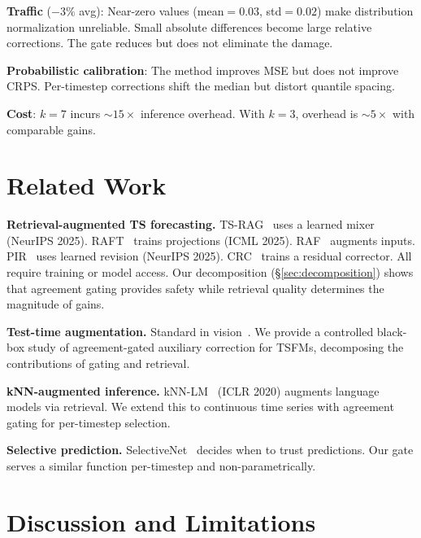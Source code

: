 \documentclass{article}
\begin{document}
\textbf{Traffic} ($-3\%$ avg): Near-zero values (mean${=}0.03$, std${=}0.02$) make distribution normalization unreliable. Small absolute differences become large relative corrections. The gate reduces but does not eliminate the damage.

\textbf{Probabilistic calibration}: The method improves MSE but does not improve CRPS. Per-timestep corrections shift the median but distort quantile spacing.

\textbf{Cost}: $k{=}7$ incurs ${\sim}15{\times}$ inference overhead. With $k{=}3$, overhead is ${\sim}5{\times}$ with comparable gains.

\section{Related Work}

\textbf{Retrieval-augmented TS forecasting.} TS-RAG~\cite{ning2025tsrag} uses a learned mixer (NeurIPS 2025). RAFT~\cite{han2025raft} trains projections (ICML 2025). RAF~\cite{tire2024raf} augments inputs. PIR~\cite{pir2025} uses learned revision (NeurIPS 2025). CRC~\cite{crc2025} trains a residual corrector. All require training or model access. Our decomposition (\S\ref{sec:decomposition}) shows that agreement gating provides safety while retrieval quality determines the magnitude of gains.

\textbf{Test-time augmentation.} Standard in vision~\cite{shanmugam2021tta}. We provide a controlled black-box study of agreement-gated auxiliary correction for TSFMs, decomposing the contributions of gating and retrieval.

\textbf{kNN-augmented inference.} kNN-LM~\cite{khandelwal2020knnlm} (ICLR 2020) augments language models via retrieval. We extend this to continuous time series with agreement gating for per-timestep selection.

\textbf{Selective prediction.} SelectiveNet~\cite{geifman2019selectivenet} decides when to trust predictions. Our gate serves a similar function per-timestep and non-parametrically.

\section{Discussion and Limitations}
\end{document}

